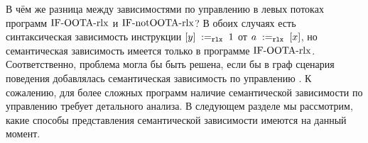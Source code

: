 В чём же разница между зависимостями по управлению в левых потоках программ 
${\rm IF\text{-}OOTA\text{-}rlx}$ и ${\rm IF\text{-}notOOTA\text{-}rlx}$?
В обоих случаях есть синтаксическая зависимость инструкции $[y] \;:=_{\mathtt{rlx}}\;1$ от
$a \;:=_{\mathtt{rlx}}\;[x]$, но семантическая зависимость имеется
только в программе ${\rm IF\text{-}OOTA\text{-}rlx}$.
Соответственно, проблема могла бы быть решена, если бы в граф сценария поведения добавлялась
семантическая зависимость по управлению \cite{Batty-Sewell:WNote14}.
К сожалению, для более сложных программ наличие семантической зависимости по управлению
требует детального анализа.
В следующем разделе мы рассмотрим, какие способы представления семантической зависимости
имеются на данный момент.



